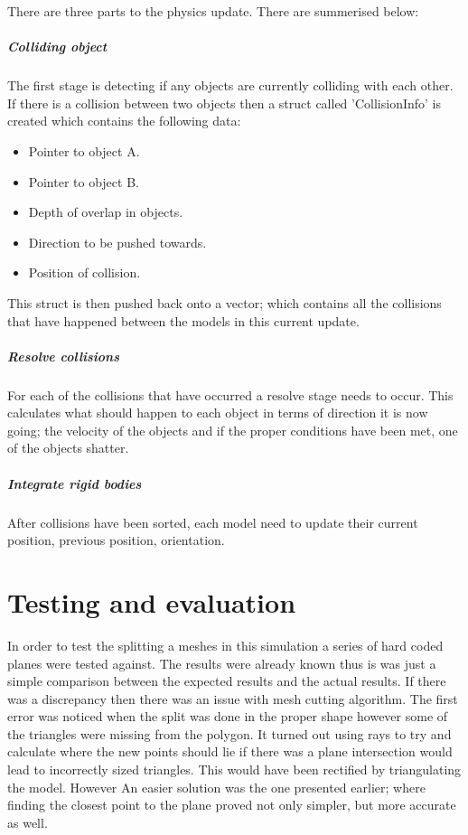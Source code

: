 \documentclass[conference,backref=page]{acmsiggraph}
\begin{document}
There are three parts to the physics update. There are summerised below:

\subparagraph{Colliding object}
The first stage is detecting if any objects are currently colliding with each other.
If there is a collision between two objects then a struct called 'CollisionInfo' is created which contains the following data:

\begin{itemize}
\item{Pointer to object A.}
\item{Pointer to object B.}
\item{Depth of overlap in objects.}
\item{Direction to be pushed towards.}
\item{Position of collision.}
\end{itemize}

This struct is then pushed back onto a vector; which contains all the collisions that have happened between the models in this current update.
\subparagraph{Resolve collisions}\hfill

For each of the collisions that have occurred a resolve stage needs to occur. This calculates what should happen to each object in terms of direction it is now going; the velocity of the objects and if the proper conditions have been met, one of the objects shatter.
\subparagraph{Integrate rigid bodies}\hfill

After collisions have been sorted, each model need to update their current position, previous position, orientation.

\section{Testing and evaluation}

In order to test the splitting a meshes in this simulation a series of hard coded planes were tested against. The results were already known thus is was just a simple comparison between the expected results and the actual results. If there was a discrepancy then there was an issue with mesh cutting algorithm. The first error was noticed when the split was done in the proper shape however some of the triangles were missing from the polygon. It turned out using rays to try and calculate where the new points should lie if there was a plane intersection would lead to incorrectly sized triangles. This would have been rectified by triangulating the model. However An easier solution was the one presented earlier; where finding the closest point to the plane proved not only simpler, but more accurate as well.
\end{document}
